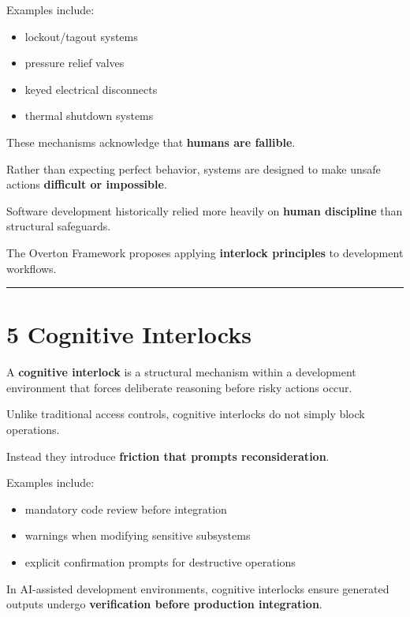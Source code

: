 \documentclass[
]{article}
\providecommand{\tightlist}{%
  \setlength{\itemsep}{0pt}\setlength{\parskip}{0pt}}
\begin{document}
Examples include:

\begin{itemize}
\tightlist
\item
  lockout/tagout systems
\item
  pressure relief valves
\item
  keyed electrical disconnects
\item
  thermal shutdown systems
\end{itemize}

These mechanisms acknowledge that \textbf{humans are fallible}.

Rather than expecting perfect behavior, systems are designed to make
unsafe actions \textbf{difficult or impossible}.

Software development historically relied more heavily on \textbf{human
discipline} than structural safeguards.

The Overton Framework proposes applying \textbf{interlock principles} to
development workflows.

\begin{center}\rule{0.5\linewidth}{0.5pt}\end{center}

\section{5 Cognitive Interlocks}\label{5-cognitive-interlocks}

A \textbf{cognitive interlock} is a structural mechanism within a
development environment that forces deliberate reasoning before risky
actions occur.

Unlike traditional access controls, cognitive interlocks do not simply
block operations.

Instead they introduce \textbf{friction that prompts reconsideration}.

Examples include:

\begin{itemize}
\tightlist
\item
  mandatory code review before integration
\item
  warnings when modifying sensitive subsystems
\item
  explicit confirmation prompts for destructive operations
\end{itemize}

In AI-assisted development environments, cognitive interlocks ensure
generated outputs undergo \textbf{verification before production
integration}.
\end{document}
